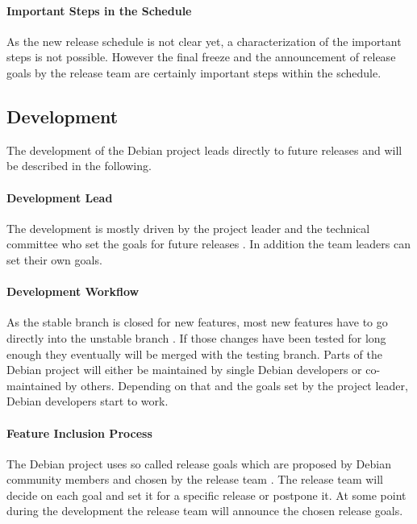 \paragraph{Important Steps in the Schedule}

As the new release schedule is not clear yet, a characterization of the
important steps is not possible. However the final freeze and the announcement
of release goals by the release team are certainly important steps within the
schedule.

\subsection{Development}

The development of the Debian project leads directly to future releases and
will be described in the following.

\paragraph{Development Lead}

The development is mostly driven by the project leader and the technical
committee who set the goals for future releases \cite{DebianOrg}. In addition
the team leaders can set their own goals.

\paragraph{Development Workflow}

As the stable branch is closed for new features, most new features have to go
directly into the unstable branch
\cite{DebianFAQ,DebianDev,DebianReleaseManagement}. If those changes have been
tested for long enough they eventually will be merged with the testing branch.
Parts of the Debian project will either be maintained by single Debian
developers or co-maintained by others. Depending on that and the goals set by
the project leader, Debian developers start to work.

\paragraph{Feature Inclusion Process}

The Debian project uses so called release goals which are proposed by Debian
community members and chosen by the release team
\cite{DebianReleaseGoals,McGovern2011}. The release team will decide on each
goal and set it for a specific release or postpone it. At some point during the
development the release team will announce the chosen release goals.


